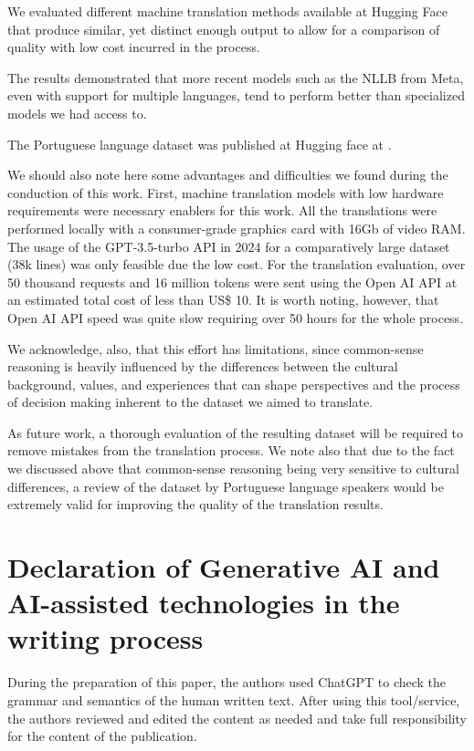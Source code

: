 \documentclass[runningheads]{llncs}
\begin{document}
We evaluated different machine translation methods available at Hugging Face that produce similar, yet distinct enough output to allow for a comparison of quality with low cost incurred in the process.

The results demonstrated that more recent models such as the NLLB from Meta, even with support for multiple languages, tend to perform better than specialized models we had access to.

The Portuguese language dataset was published at Hugging face at \cite{socialiqa_pt}. 

We should also note here some advantages and difficulties we found during the conduction of this work. First, machine translation models with low hardware requirements were necessary enablers for this work. All the translations were performed locally with a consumer-grade graphics card with 16Gb of video RAM.
The usage of the GPT-3.5-turbo API in 2024 for a comparatively large dataset (38k lines) was only feasible due the low cost. For the translation evaluation,
over 50 thousand requests and 16 million tokens were sent using the Open AI API at an estimated total cost of less than US\$ 10. It is worth noting, however, that Open AI API speed was quite slow requiring over 50 hours for the whole
process.

We acknowledge, also, that this effort has limitations, since common-sense reasoning is heavily influenced by the differences between the cultural background, values, and experiences that can shape perspectives and the process of decision making inherent to the dataset we aimed to translate.

As future work, a thorough evaluation of the resulting dataset will be required to remove mistakes from the translation process. We note also that due to
the fact we discussed above that common-sense reasoning being very sensitive to cultural differences, a review of the dataset by Portuguese language speakers would be extremely valid for improving the quality of the translation results.

\section*{Declaration of Generative AI and AI-assisted technologies in the writing process}

During the preparation of this paper, the authors used ChatGPT to check the grammar and semantics of the human written text. After using this tool/service, the authors reviewed and edited the content as needed and take full responsibility for the content of the publication.
\end{document}

